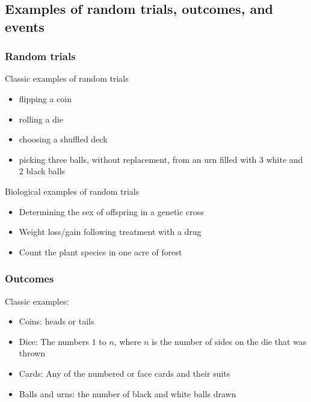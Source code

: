 \documentclass[]{book}
\providecommand{\tightlist}{%
  \setlength{\itemsep}{0pt}\setlength{\parskip}{0pt}}
\theoremstyle{definition}
\theoremstyle{definition}
\theoremstyle{definition}
\theoremstyle{remark}
\begin{document}
\hypertarget{examples-of-random-trials-outcomes-and-events}{%
\subsection{Examples of random trials, outcomes, and
events}\label{examples-of-random-trials-outcomes-and-events}}

\hypertarget{random-trials}{%
\subsubsection{Random trials}\label{random-trials}}

Classic examples of random trials

\begin{itemize}
\tightlist
\item
  flipping a coin
\item
  rolling a die
\item
  choosing a shuffled deck
\item
  picking three balls, without replacement, from an urn filled with 3
  white and 2 black balls
\end{itemize}

Biological examples of random trials

\begin{itemize}
\tightlist
\item
  Determining the sex of offspring in a genetic cross
\item
  Weight loss/gain following treatment with a drug
\item
  Count the plant species in one acre of forest
\end{itemize}

\hypertarget{outcomes}{%
\subsubsection{Outcomes}\label{outcomes}}

Classic examples:

\begin{itemize}
\tightlist
\item
  Coins: heads or tails
\item
  Dice: The numbers \(1\) to \(n\), where \(n\) is the number of sides
  on the die that was thrown
\item
  Cards: Any of the numbered or face cards and their suits
\item
  Balls and urns: the number of black and white balls drawn
\end{itemize}
\end{document}
